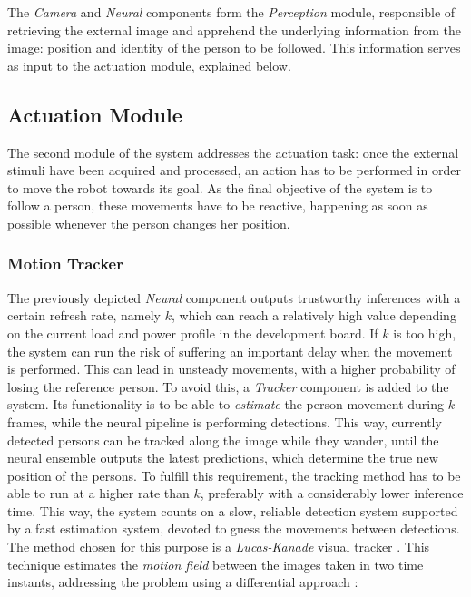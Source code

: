 The \textit{Camera} and \textit{Neural} components form the \textit{Perception} module, responsible of retrieving the external image and apprehend the underlying information from the image: position and identity of the person to be followed. This information serves as input to the actuation module, explained below.


\subsection{Actuation Module}

The second module of the system addresses the actuation task: once the external stimuli have been acquired and processed, an action has to be performed in order to move the robot towards its goal. As the final objective of the system is to follow a person, these movements have to be reactive, happening as soon as possible whenever the person changes her position.\\

\subsubsection{Motion Tracker}

The previously depicted \textit{Neural} component outputs trustworthy inferences with a certain refresh rate, namely $k$, which can reach a relatively high value depending on the current load and power profile in the development board. If $k$ is too high, the system can run the risk of suffering an important delay when the movement is performed. This can lead in unsteady movements, with a higher probability of losing the reference person. To avoid this, a \textit{Tracker} component is added to the system. Its functionality is to be able to \textit{estimate} the person movement during $k$ frames, while the neural pipeline is performing detections. This way, currently detected persons can be tracked along the image while they wander, until the neural ensemble outputs the latest predictions, which determine the true new position of the persons. To fulfill this requirement, the tracking method has to be able to run at a higher rate than $k$, preferably with a considerably lower inference time. This way, the system counts on a slow, reliable detection system supported by a fast estimation system, devoted to guess the movements between detections.\\

The method chosen for this purpose is a \textit{Lucas-Kanade} visual tracker \cite{diapos_cv_motion_estimation}.  This technique estimates the \textit{motion field} between the images taken in two time instants, addressing the problem using a differential approach \cite{lucas_kanade}:

